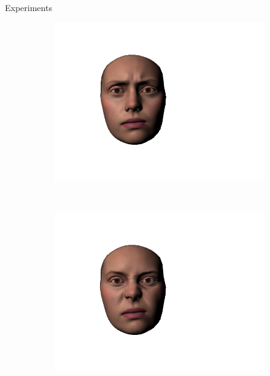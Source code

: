 \documentclass{beamer}
\begin{document}
\begin{frame}{Experiments}
\begin{itemize}
\begin{figure}[htbp!]
\begin{subfigure}[b]{0.12\textwidth}
                \includegraphics[trim = 50mm 30mm 80mm 30mm,clip,width=\textwidth]{img/eyebrowsin2.png}
        \end{subfigure} ~
        \begin{subfigure}[b]{0.12\textwidth}
                \includegraphics[trim = 50mm 30mm 80mm 30mm,clip,width=\textwidth]{img/nosewrinkle2.png}
        \end{subfigure}
        ~ %
        \begin{subfigure}[b]{0.12\textwidth}

\end{subfigure}
\end{figure}
\end{itemize}
\end{frame}
\end{document}
